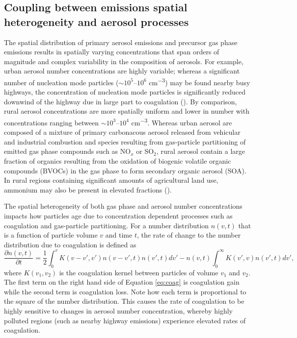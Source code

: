\subsection{Coupling between emissions spatial heterogeneity and aerosol processes}

The spatial distribution of primary aerosol emissions and precursor gas phase emissions results in spatially varying concentrations that span orders of magnitude and complex variability in the composition of aerosols. For example, urban aerosol number concentrations are highly variable; whereas a significant number of nucleation mode particles ($\sim10^5$--$10^6$ \si{cm^{-3}}) may be found nearby busy highways, the concentration of nucleation mode particles is significantly reduced downwind of the highway due in large part to coagulation (\cite{zhu_study_2002}). By comparison, rural aerosol concentrations are more spatially uniform and lower in number with concentrations ranging between $\sim10^3$--$10^4$ \si{cm^{-3}}. Whereas urban aerosol are composed of a mixture of primary carbonacous aerosol released from vehicular and industrial combustion and species resulting from gas-particle partitioning of emitted gas phase compounds such as NO$_x$ or SO$_2$, rural aerosol contain a large fraction of organics resulting from the oxidation of biogenic volatile organic compounds (BVOCs) in the gas phase to form secondary organic aerosol (SOA). In rural regions containing significant amounts of agricultural land use, ammonium may also be present in elevated fractions (\cite{seinfeld_atmospheric_1998}). 

The spatial heterogeneity of both gas phase and aerosol number concentrations impacts how particles age due to concentration dependent processes such as coagulation and gas-particle partitioning. For a number distribution $n(v,t)$ that is a function of particle volume $v$ and time $t$, the rate of change to the number distribution due to coagulation is defined as 
\begin{equation}
\frac{\partial n(v, t)}{\partial t} = \frac{1}{2}\int_0^{v}K(v-v', v')n(v-v', t)n(v', t)dv' - n(v,t)\int_0^{\infty}K(v',v)n(v',t)dv',
\label{eq:coag}
\end{equation}
where $K(v_1, v_2)$ is the coagulation kernel between particles of volume $v_1$ and $v_2$. The first term on the right hand side of Equation \ref{eq:coag} is coagulation gain while the second term is coagulation loss. Note how each term is proportional to the square of the number distribution. This causes the rate of coagulation to be highly sensitive to changes in aerosol number concentration, whereby highly polluted regions (such as nearby highway emissions) experience elevated rates of coagulation. 

